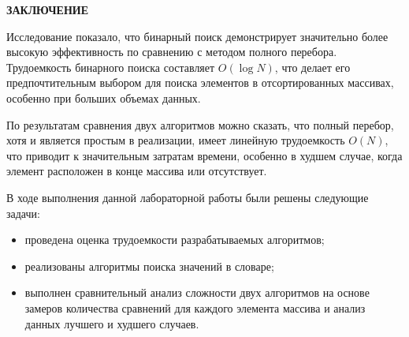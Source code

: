 \begin{center}
    \textbf{ЗАКЛЮЧЕНИЕ}
\end{center}

Исследование показало, что бинарный поиск демонстрирует значительно более высокую эффективность по сравнению с методом полного перебора. Трудоемкость бинарного поиска составляет $O(\log N)$, что делает его предпочтительным выбором для поиска элементов в отсортированных массивах, особенно при больших объемах данных.

По результатам сравнения двух алгоритмов можно сказать, что полный перебор, хотя и является простым в реализации, имеет линейную трудоемкость $O(N)$, что приводит к значительным затратам времени, особенно в худшем случае, когда элемент расположен в конце массива или отсутствует. 

\vspace{5mm}

В ходе выполнения данной лабораторной работы были решены следующие задачи:
\begin{itemize}
    \item проведена оценка трудоемкости разрабатываемых алгоритмов;
    \item реализованы алгоритмы поиска значений в словаре;
    \item выполнен сравнительный анализ сложности двух алгоритмов на основе замеров количества сравнений для каждого элемента массива и анализ данных лучшего и худшего случаев.
\end{itemize}